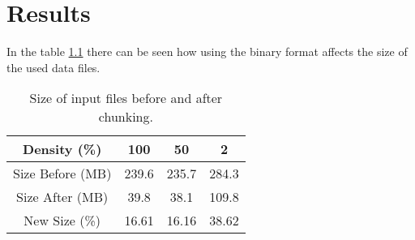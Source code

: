 \chapter{Results}

In the table \ref{tab_chunk} there can be seen how using the binary format affects the size of the used data files.

\begin{table}
\centering
\begin{tabular} {| c | c | c | c |}

\hline
Density (\%) & 100 & 50 & 2 \\
\hline
Size Before (MB) & 239.6 & 235.7 & 284.3 \\
\hline
Size After (MB) & 39.8 & 38.1 & 109.8 \\
\hline
\hline
New Size (\%) & 16.61 & 16.16 & 38.62  \\
\hline
\end{tabular}
\caption{Size of input files before and after chunking.}
\label{tab_chunk}
\end{table}


